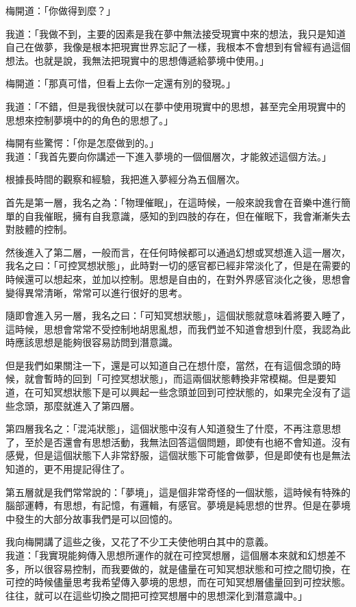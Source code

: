 梅開道：「你做得到麼？」

我道：「我做不到，主要的因素是我在夢中無法接受現實中來的想法，我只是知道自己在做夢，我像是根本把現實世界忘記了一樣，我根本不會想到有曾經有過這個想法。也就是說，我無法把現實中的思想傳遞給夢境中使用。」

梅開道：「那真可惜，但看上去你一定還有別的發現。」

我道：「不錯，但是我很快就可以在夢中使用現實中的思想，甚至完全用現實中的思想來控制夢境中的的角色的思想了。」

梅開有些驚愕：「你是怎麼做到的。」
\\


我道：「我首先要向你講述一下進入夢境的一個個層次，才能敘述這個方法。」

根據長時間的觀察和經驗，我把進入夢經分為五個層次。

首先是第一層，我名之為：「物理催眠」，在這時候，一般來說我會在音樂中進行簡單的自我催眠，擁有自我意識，感知的到四肢的存在，但在催眠下，我會漸漸失去對肢體的控制。

然後進入了第二層，一般而言，在任何時候都可以通過幻想或冥想進入這一層次，我名之曰：「可控冥想狀態」，此時對一切的感官都已經非常淡化了，但是在需要的時候還可以想起來，並加以控制。思想是自由的，在對外界感官淡化之後，思想會變得異常清晰，常常可以進行很好的思考。

隨即會進入另一層，我名之曰：「可知冥想狀態」，這個狀態就意味着將要入睡了，這時候，思想會常常不受控制地胡思亂想，而我們並不知道會想到什麼，我認為此時應該思想是能夠很容易訪問到潛意識。

但是我們如果關注一下，還是可以知道自己在想什麼，當然，在有這個念頭的時候，就會暫時的回到「可控冥想狀態」，而這兩個狀態轉換非常模糊。但是要知道，在可知冥想狀態下是可以興起一些念頭並回到可控狀態的，如果完全沒有了這些念頭，那麼就進入了第四層。

第四層我名之：「混沌狀態」，這個狀態中沒有人知道發生了什麼，不再注意思想了，至於是否還會有思想活動，我無法回答這個問題，即使有也絕不會知道。沒有感覺，但是這個狀態下人非常舒服，這個狀態下可能會做夢，但是即使有也是無法知道的，更不用提記得住了。

第五層就是我們常常說的：「夢境」，這是個非常奇怪的一個狀態，這時候有特殊的腦部運轉，有思想，有記憶，有邏輯，有感官。夢境是純思想的世界。但是在夢境中發生的大部分故事我們是可以回憶的。

我向梅開講了這些之後，又花了不少工夫使他明白其中的意義。
\\


我道：「我實現能夠傳入思想所運作的就在可控冥想層，這個層本來就和幻想差不多，所以很容易控制，而我要做的，就是儘量在可知冥想狀態和可控之間切換，在可控的時候儘量思考我希望傳入夢境的思想，而在可知冥想層儘量回到可控狀態。往往，就可以在這些切換之間把可控冥想層中的思想深化到潛意識中。」

